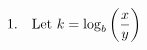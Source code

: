 \documentclass[preview]{standalone}
\begin{document}
\begin{align*}
\special{dvisvgm:raw <g id='unique000'>}1.\quad \text{Let } k = \log_b \left( \frac{x}{y} \right)\special{dvisvgm:raw </g>}
\end{align*}
\end{document}
